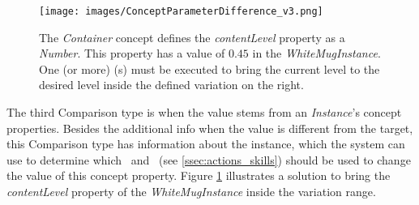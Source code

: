 \begin{figure}[t!]
    \centering
    \texttt{[image: images/ConceptParameterDifference\_v3.png]}
    \caption{The \textit{Container} concept defines the \textit{contentLevel} property as a \textit{Number}. This property has a value of $0.45$ in the \textit{WhiteMugInstance}. One (or more) \skill(s) must be executed to bring the current level to the desired level inside the defined variation on the right.} \label{fig:concept_property_difference}
\end{figure}

The third Comparison type is when the value stems from an \textit{Instance}'s concept properties. Besides the additional info when the value is different from the target, this Comparison type has information about the instance, which the system can use to determine which \actions\ and \skills\ (see \ref{ssec:actions_skills}) should be used to change the value of this concept property. Figure \ref{fig:concept_property_difference} illustrates a solution to bring the \textit{contentLevel} property of the \textit{WhiteMugInstance} inside the variation range.

